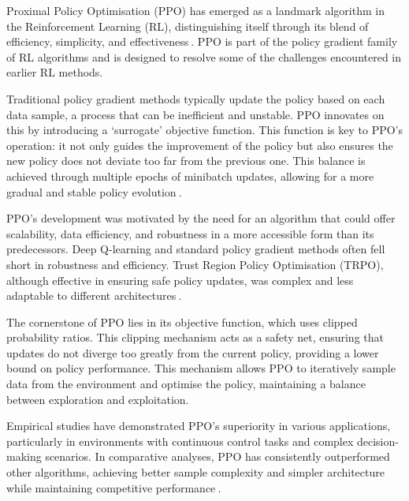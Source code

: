 
Proximal Policy Optimisation (PPO) has emerged as a landmark algorithm in the Reinforcement Learning (RL), distinguishing itself through its blend of efficiency, simplicity, and effectiveness$~$\cite{schulman2017ppo}. PPO is part of the policy gradient family of RL algorithms and is designed to resolve some of the challenges encountered in earlier RL methods.

Traditional policy gradient methods typically update the policy based on each data sample, a process that can be inefficient and unstable. PPO innovates on this by introducing a `surrogate' objective function. This function is key to PPO's operation: it not only guides the improvement of the policy but also ensures the new policy does not deviate too far from the previous one. This balance is achieved through multiple epochs of minibatch updates, allowing for a more gradual and stable policy evolution$~$\cite{beznosikov2023stochastic}.

PPO's development was motivated by the need for an algorithm that could offer scalability, data efficiency, and robustness in a more accessible form than its predecessors. Deep Q-learning and standard policy gradient methods often fell short in robustness and efficiency. Trust Region Policy Optimisation (TRPO), although effective in ensuring safe policy updates, was complex and less adaptable to different architectures$~$\cite{Engstrom2020Implementation}.

The cornerstone of PPO lies in its objective function, which uses clipped probability ratios. This clipping mechanism acts as a safety net, ensuring that updates do not diverge too greatly from the current policy, providing a lower bound on policy performance. This mechanism allows PPO to iteratively sample data from the environment and optimise the policy, maintaining a balance between exploration and exploitation.

Empirical studies have demonstrated PPO's superiority in various applications, particularly in environments with continuous control tasks and complex decision-making scenarios. In comparative analyses, PPO has consistently outperformed other algorithms, achieving better sample complexity and simpler architecture while maintaining competitive performance$~$\cite{Larsen2021Comparing}.

